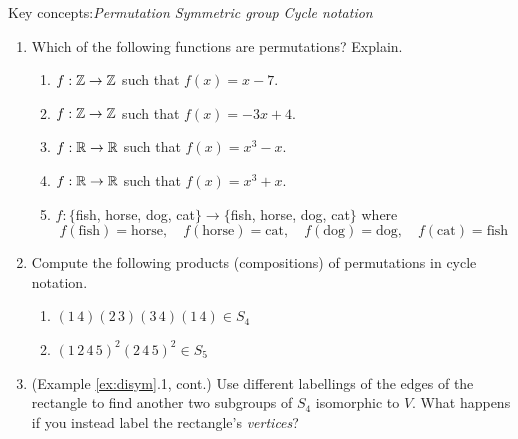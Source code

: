   
\begin{exercises}
	Key concepts:\quad \emph{Permutation \qquad Symmetric group \qquad Cycle notation}
	
	\begin{enumerate}
	  \item Which of the following functions are permutations? Explain.
	  \begin{enumerate}
	      \item $f:\mathbb{Z}\to\mathbb{Z}$ such that $f(x)=x-7$.
	      \item $f:\mathbb{Z}\to\mathbb{Z}$ such that $f(x)=-3x+4$.
	      \item $f:\mathbb{R}\to\mathbb{R}$ such that $f(x)=x^3-x$.
	      \item $f:\mathbb{R}\to\mathbb{R}$ such that $f(x)=x^3+x$.
	      \item $f:\{$fish, horse, dog, cat$\}\to\{$fish, horse, dog, cat$\}$ where 
	      \[
	      	f(\text{fish})=\text{horse},\quad f(\text{horse})=\text{cat},\quad f(\text{dog})=\text{dog},\quad f(\text{cat})=\text{fish}
	      \]
	  \end{enumerate}
	    
	  
	  \item Compute the following products (compositions) of permutations in cycle notation.
	  \begin{enumerate}
	    \item {}\lstsp $(1\,4)(2\,3)(3\,4)(1\,4)\in S_4$
	    \setcounter{enumii}{2}
	    \item {}\lstsp $(1\,2\,4\,5)^2(2\,4\,5)^2\in S_5$
	  \end{enumerate}
	  
	  \goodbreak
	  
	  
	  \item\label{exs:kleins4} (Example \ref{ex:disym}.1, cont.) Use different labellings of the edges of the rectangle to find another two subgroups of $S_4$ isomorphic to $V$. What happens if you instead label the  rectangle's \emph{vertices}?
	  

\end{enumerate}
\end{exercises}
